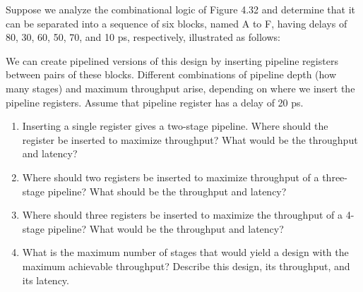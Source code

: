 \documentclass[12pt]{article}
\newenvironment{ex}[2][Exercise]{\begin{trivlist}
		\item[\hskip \labelsep {\bfseries #1}\hskip \labelsep {\bfseries #2.}]}{\end{trivlist}}
\begin{document}
\begin{ex}{4.28}
	Suppose we analyze the combinational logic of Figure 4.32 and determine that it
	can be separated into a sequence of six blocks, named A to F, having delays
	of 80, 30, 60, 50, 70, and 10 ps, respectively, illustrated as follows:
	
	We can create pipelined versions of this design by inserting pipeline registers
	between pairs of these blocks. Different combinations of pipeline depth (how
	many stages) and maximum throughput arise, depending on where we insert the
	pipeline registers. Assume that pipeline register has a delay of 20 ps.
	\begin{enumerate}[label=(\alph*)]
		\item Inserting a single register gives a two-stage pipeline. Where should
		the register be inserted to maximize throughput? What would be the throughput
		and latency?
		\item Where should two registers be inserted to maximize throughput of a
		three-stage pipeline? What should be the throughput and latency?
		\item Where should three registers be inserted to maximize the throughput
		of a 4-stage pipeline? What would be the throughput and latency?
		\item What is the maximum number of stages that would yield a design
		with the maximum achievable throughput? Describe this design, its throughput,
		and its latency.
	\end{enumerate}
\end{ex}
\end{document}
